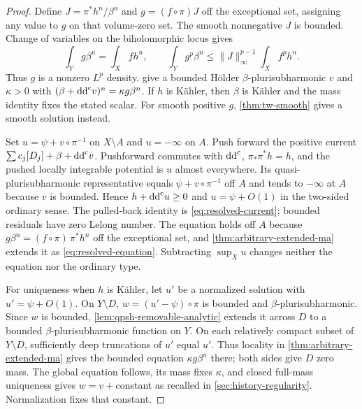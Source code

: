 \begin{proof}
Define $J=\pi^*h^n/\beta^n$ and $g=(f\circ\pi)J$ off the exceptional set, assigning any value to $g$ on that volume-zero set. The smooth nonnegative $J$ is bounded. Change of variables on the biholomorphic locus gives
\begin{equation}\label{eq:prescribed-transport}
 \int_Yg\beta^n=\int_Xfh^n,
 \qquad
 \int_Yg^p\beta^n\leq \|J\|_\infty^{p-1}\int_Xf^ph^n.
\end{equation}
Thus $g$ is a nonzero $L^p$ density.  give a bounded H\"older $\beta$-plurisubharmonic $v$ and $\kappa>0$ with $(\beta+\mathrm{dd}^{\mathrm{c}} v)^n=\kappa g\beta^n$. If $h$ is K\"ahler, then $\beta$ is K\"ahler and the mass identity fixes the stated scalar. For smooth positive $g$, \cref{thm:tw-smooth} gives a smooth solution instead.

Set $u=\psi+v\circ\pi^{-1}$ on $X\setminus A$ and $u=-\infty$ on $A$. Push forward the positive current $\sum c_j[D_j]+\beta+\mathrm{dd}^{\mathrm{c}} v$. Pushforward commutes with $\mathrm{dd}^{\mathrm{c}}$, $\pi_*\pi^*h=h$, and the pushed locally integrable potential is $u$ almost everywhere. Its quasi-plurisubharmonic representative equals $\psi+v\circ\pi^{-1}$ off $A$ and tends to $-\infty$ at $A$ because $v$ is bounded. Hence $h+\mathrm{dd}^{\mathrm{c}} u\geq0$ and $u=\psi+O(1)$ in the two-sided ordinary sense. The pulled-back identity is \eqref{eq:resolved-current}; bounded residuals have zero Lelong number. The equation holds off $A$ because $g\beta^n=(f\circ\pi)\,\pi^*h^n$ off the exceptional set, and \cref{thm:arbitrary-extended-ma} extends it as \eqref{eq:resolved-equation}. Subtracting $\sup_Xu$ changes neither the equation nor the ordinary type.

For uniqueness when $h$ is K\"ahler, let $u'$ be a normalized solution with $u'=\psi+O(1)$. On $Y\setminus D$, $w=(u'-\psi)\circ\pi$ is bounded and $\beta$-plurisubharmonic. Since $w$ is bounded, \cref{lem:qpsh-removable-analytic} extends it across $D$ to a bounded $\beta$-plurisubharmonic function on $Y$. On each relatively compact subset of $Y\setminus D$, sufficiently deep truncations of $u'$ equal $u'$. Thus locality in \cref{thm:arbitrary-extended-ma} gives the bounded equation $\kappa g\beta^n$ there; both sides give $D$ zero mass. The global equation follows, its mass fixes $\kappa$, and closed full-mass uniqueness gives $w=v+$constant as recalled in \cref{sec:history-regularity}. Normalization fixes that constant.
\end{proof}

